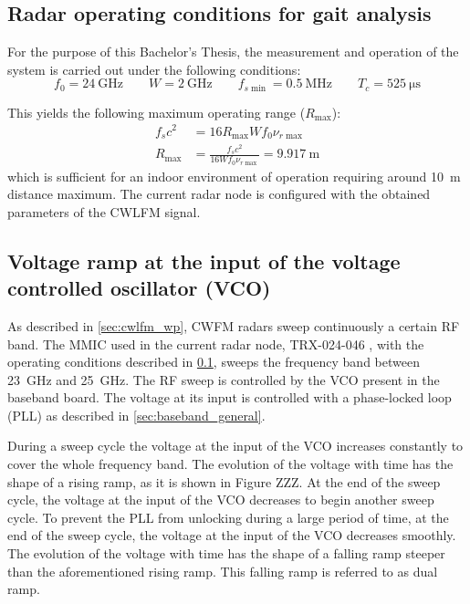 \subsection{Radar operating conditions for gait analysis} \label{sec:radar_operating_conditions}

For the purpose of this Bachelor's Thesis, the measurement and operation of the system is carried out under the following conditions:
\begin{equation} \label{eq:if_conditions}
	f_0 = \SI{24}{\giga\hertz} \qquad W = \SI{2}{\giga\hertz} \qquad f_{s\min} = \SI{0.5}{\mega\hertz} \qquad T_c = \SI{525}{\micro\second}
\end{equation}

This yields the following maximum operating range ($R_{\max}$):
\begin{align}
	f_s c^2 &= 16 R_{\max}W f_0 \nu_{r\max} \\
	R_{\max} &= \frac{f_s c^2}{16 W f_0 \nu_{r\max}} = \SI{9.917}{\meter}
\end{align}
which is sufficient for an indoor environment of operation requiring around \SI{10}{\meter} distance maximum. The current radar node is configured with the obtained parameters of the CWLFM signal.

\subsection{Voltage ramp at the input of the voltage controlled oscillator (VCO)}  \label{sec:vco_characterisation}

As described in \cref{sec:cwlfm_wp}, CWFM radars sweep continuously a certain RF band. The MMIC used in the current radar node, TRX-024-046 \cite{ZZZ}, with the operating conditions described in \cref{sec:radar_operating_conditions}, sweeps the frequency band between \SI{23}{\giga\hertz} and \SI{25}{\giga\hertz}. The RF sweep is controlled by the VCO present in the baseband board. The voltage at its input is controlled with a phase-locked loop (PLL) as described in \cref{sec:baseband_general}.

During a sweep cycle the voltage at the input of the VCO increases constantly to cover the whole frequency band. The evolution of the voltage with time has the shape of a rising ramp, as it is shown in Figure ZZZ. At the end of the sweep cycle, the voltage at the input of the VCO decreases to begin another sweep cycle. To prevent the PLL from unlocking during a large period of time, at the end of the sweep cycle, the voltage at the input of the VCO decreases smoothly. The evolution of the voltage with time has the shape of a falling ramp steeper than the aforementioned rising ramp. This falling ramp is referred to as dual ramp.

